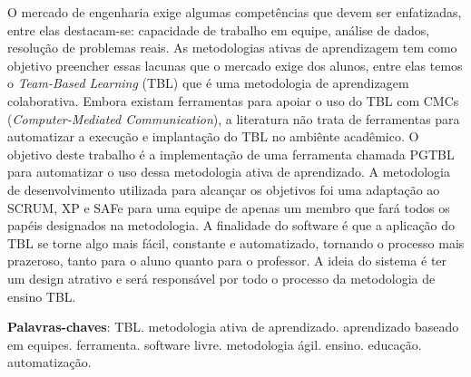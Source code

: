 \begin{resumo}
O mercado de engenharia exige algumas competências que devem ser enfatizadas, entre elas destacam-se: capacidade de trabalho em equipe, análise de dados, resolução de problemas reais. As metodologias ativas de aprendizagem tem como objetivo preencher essas lacunas que o mercado exige dos alunos, entre elas temos o \textit{Team-Based Learning} (TBL) que é uma metodologia de aprendizagem colaborativa. Embora existam ferramentas para apoiar o uso do TBL com CMCs (\textit{Computer-Mediated Communication}), a literatura não trata de ferramentas para automatizar a execução e implantação do TBL no ambiênte acadêmico. O objetivo deste trabalho é a implementação de uma ferramenta chamada PGTBL para automatizar o uso dessa metodologia ativa de aprendizado. A metodologia de desenvolvimento utilizada para alcançar os objetivos foi uma adaptação ao SCRUM, XP e SAFe para uma equipe de apenas um membro que fará todos os papéis designados na metodologia. A finalidade do software é que a aplicação do TBL se torne algo mais fácil, constante e automatizado, tornando o processo mais prazeroso, tanto para o aluno quanto para o professor. A ideia do sistema é ter um design atrativo e será responsável por todo o processo da metodologia de ensino TBL.

 \vspace{\onelineskip}

 \noindent
 \textbf{Palavras-chaves}: TBL. metodologia ativa de aprendizado. aprendizado baseado em equipes. ferramenta. software
  livre. metodologia ágil. ensino. educação. automatização.
\end{resumo}
